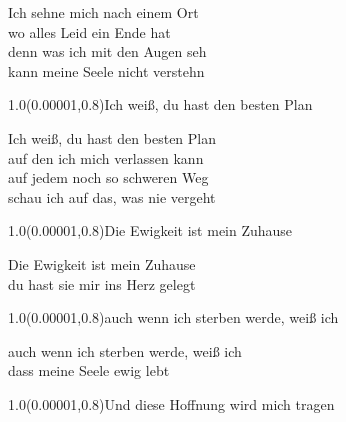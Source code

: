 \documentclass[aspectratio=169]{beamer}
\begin{document}
\color{white}
\begin{frame}
\centering
\color{white}
\huge{Ich sehne mich nach einem Ort} \\
\huge{wo alles Leid ein Ende hat} \\
\huge{denn was ich mit den Augen seh} \\
\huge{kann meine Seele nicht verstehn} \\

\begin{textblock}{1.0}(0.00001,0.8)\color{gray}\normalsize{Ich weiß, du hast den besten Plan}\end{textblock}
\end{frame}

\begin{frame}
\centering
\color{white}
\huge{Ich weiß, du hast den besten Plan} \\
\huge{auf den ich mich verlassen kann} \\
\huge{auf jedem noch so schweren Weg} \\
\huge{schau ich auf das, was nie vergeht} \\

\begin{textblock}{1.0}(0.00001,0.8)\color{gray}\normalsize{Die Ewigkeit ist mein Zuhause}\end{textblock}
\end{frame}

\begin{frame}
\centering
\color{white}
\huge{Die Ewigkeit ist mein Zuhause} \\
\huge{du hast sie mir ins Herz gelegt} \\

\begin{textblock}{1.0}(0.00001,0.8)\color{gray}\normalsize{auch wenn ich sterben werde, weiß ich}\end{textblock}
\end{frame}

\begin{frame}
\centering
\color{white}
\huge{auch wenn ich sterben werde, weiß ich} \\
\huge{dass meine Seele ewig lebt} \\

\begin{textblock}{1.0}(0.00001,0.8)\color{gray}\normalsize{Und diese Hoffnung wird mich tragen}\end{textblock}
\end{frame}
\end{document}
